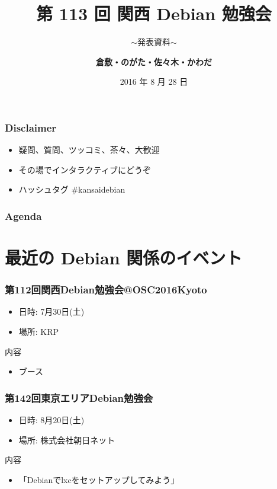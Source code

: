 \documentclass[cjk,dvipdfmx,10pt,compress,%
hyperref={bookmarks=true,bookmarksnumbered=true,bookmarksopen=false,%
colorlinks=false,%
pdftitle={第 113 回 関西 Debian 勉強会},%
pdfauthor={倉敷・のがた・佐々木・かわだ},%
pdfsubject={資料},%
}]{beamer}
\title{第 113 回 関西 Debian 勉強会}
\subtitle{$\sim$発表資料$\sim$}
\author[かわだ てつたろう]{{\large\bf 倉敷・のがた・佐々木・かわだ}}
\institute[Debian JP]{{\normalsize\tt 関西 Debian 勉強会}}
\date{{\small 2016 年 8 月 28 日}}
\begin{document}
\settitleslide
\begin{frame}
\titlepage
\end{frame}
\setdefaultslide

\begin{frame}[fragile]
  \frametitle{Disclaimer}
  \begin{itemize}
  \item 疑問、質問、ツッコミ、茶々、\alert{大歓迎}
  \item その場でインタラクティブにどうぞ
  \item ハッシュタグ \#kansaidebian
  \end{itemize}
\end{frame}

\begin{frame}[fragile]
\frametitle{Agenda}

\tableofcontents

\end{frame}

\section{最近の Debian 関係のイベント}

\begin{frame}[fragile]
  \frametitle{第112回関西Debian勉強会@OSC2016Kyoto}
  \begin{itemize}
  \item 日時: 7月30日(土)
  \item 場所: KRP
  \end{itemize}
  \begin{block}{内容}
    \begin{itemize}
    \item ブース
    \end{itemize}
  \end{block}
\end{frame}

\begin{frame}[fragile]
  \frametitle{第142回東京エリアDebian勉強会}
  \begin{itemize}
  \item 日時: 8月20日(土)
  \item 場所: 株式会社朝日ネット
  \end{itemize}
  \begin{block}{内容}
    \begin{itemize}
    \item 「Debianでlxcをセットアップしてみよう」
    \end{itemize}
  \end{block}
\end{frame}
\end{document}
